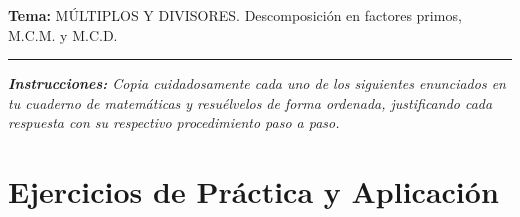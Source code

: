 \documentclass[12pt, letterpaper]{article}
\begin{document}
	\vspace{0.2cm}
	\noindent \textbf{Tema:} MÚLTIPLOS Y DIVISORES. Descomposición en factores primos, M.C.M. y M.C.D.
	\vspace{0.2cm}
	\hrule
	\vspace{0.4cm}
	
	\noindent \textit{\textbf{Instrucciones:} Copia cuidadosamente cada uno de los siguientes enunciados en tu cuaderno de matemáticas y resuélvelos de forma ordenada, justificando cada respuesta con su respectivo procedimiento paso a paso.}
	\vspace{0.6cm}
	
	\section*{Ejercicios de Práctica y Aplicación}
	
\end{document}

